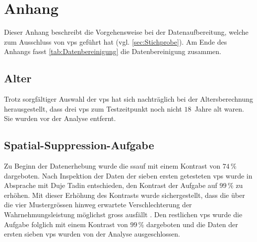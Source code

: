 \documentclass[11pt, twoside, a4paper]{book}		%
\begin{document}
\renewcommand\listfigurename{Abbildungen}		%
\listoffigures									%

\renewcommand\listtablename{Tabellen}			%
\listoftables 									%

\appendix
\setcounter{figure}{0}
\renewcommand\thefigure{\Alph{appndx}\@arabic\c@figure}
\setcounter{table}{0}
\renewcommand{\thetable}{A\arabic{table}}


\chapter[Anhang - Datenaufbereitung]{Anhang \label{cha:Anhang_A}}
Dieser Anhang beschreibt die Vorgehensweise bei der Datenaufbereitung, welche zum Ausschluss von \glspl{vp} geführt hat (vgl. \autoref{sec:Stichprobe}). Am Ende des Anhangs fasst \autoref{tab:Datenbereinigung} die Datenbereinigung zusammen.

\section{Alter}
Trotz sorgfältiger Auswahl der \glspl{vp} hat sich nachträglich bei der Altersberechnung herausgestellt, dass drei \glspl{vp} zum Testzeitpunkt noch nicht $18$~Jahre alt waren. Sie wurden vor der Analyse entfernt.

\section{Spatial-Suppression-Aufgabe}
Zu Beginn der Datenerhebung wurde die \gls{ssauf} mit einem Kontrast von $74\,\%$ dargeboten. Nach Inspektion der Daten der sieben ersten getesteten \glspl{vp} wurde in Absprache mit Duje Tadin entschieden, den Kontrast der Aufgabe auf $99\,\%$ zu erhöhen. Mit dieser Erhöhung des Kontrasts wurde sichergestellt, dass die über die vier Mustergrössen hinweg erwartete Verschlechterung der Wahrnehmungsleistung möglichst gross ausfällt \citep[für den Zusammenhang zwischen Kontrast und Wahrnehmungsleistung siehe][]{Tadin2003}. Den restlichen \glspl{vp} wurde die Aufgabe folglich mit einem Kontrast von $99\,\%$ dargeboten und die Daten der ersten sieben \glspl{vp} wurden von der Analyse ausgeschlossen.
\end{document}
